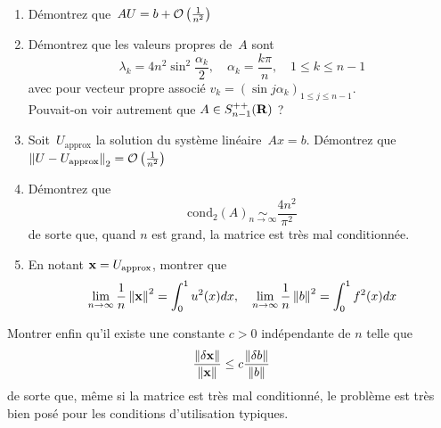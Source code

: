 \begin{exercice}$ $
	\begin{enumerate}
		\item Démontrez que~$AU=b+\mathcal{O}\left(\frac1{n^2}\right)$
		\item Démontrez que les valeurs propres de~$A$ sont $$\lambda_k = 4n^2
			\sin^2 \frac{\alpha_k}{2}, \quad \alpha_k =  \frac{k \pi}{n}, \quad
			1\leq k \leq n-1$$ avec pour vecteur propre associé $v_k = (\sin j
			\alpha_k)_{1 \leq j \leq n-1}$.\\
			Pouvait-on voir autrement que $A \in S_{n-1}^{++}(\mathbf{R})$ ?
		\item Soit~$U_{\mathrm{approx}}$ la solution du système linéaire~$Ax=b$.
			Démontrez
			que $\left\|U-U_{\mathrm{approx}}\right\|_2=\mathcal{O}\left(\frac1{n^2}\right)$
\item Démontrez que
\[
	\mathrm{cond}_2(A) \underset{n \rightarrow \infty}{\sim} \frac{4n^2}{\pi^2}
\]
de sorte que, quand $n$ est grand, la matrice est très mal conditionnée.
\item En notant $\mathbf{x} = U_{\mathrm{approx}}$, montrer que
\[
\lim_{n \rightarrow \infty } \frac{1}{n} \left\|\mathbf{x}\right\|^2 = \int_0^1 u^2(x)dx,
\quad \lim_{n \rightarrow \infty } \frac{1}{n} \left\|b\right\|^2 = \int_0^1 f^2(x)dx
\]
	\end{enumerate}
\item Montrer enfin qu'il existe une constante $c > 0$ indépendante de $n$ telle que
\[
\frac{\left\|\delta\mathbf{x}\right\|}{\left\|\mathbf{x}\right\|} \leq c \frac{\left\|\delta b\right\|}{\left\|b\right\|}
\]
de sorte que, même si la matrice est très mal conditionné, le problème est
très bien posé pour les conditions d'utilisation typiques.
\end{exercice}



